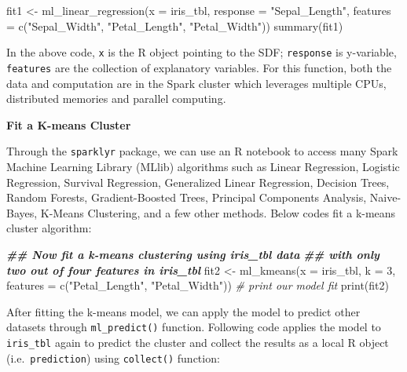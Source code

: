 \documentclass[
  12pt,
]{krantz}
\makeatletter
\newenvironment{Shaded}{\begin{snugshade}}{\end{snugshade}}
\newcommand{\AttributeTok}[1]{\textcolor[rgb]{0.61,0.61,0.61}{#1}}
\newcommand{\CommentTok}[1]{\textcolor[rgb]{0.37,0.37,0.37}{\textit{#1}}}
\newcommand{\DecValTok}[1]{\textcolor[rgb]{0.06,0.06,0.06}{#1}}
\newcommand{\DocumentationTok}[1]{\textcolor[rgb]{0.37,0.37,0.37}{\textbf{\textit{#1}}}}
\newcommand{\FunctionTok}[1]{\textcolor[rgb]{0,0,0}{#1}}
\newcommand{\NormalTok}[1]{#1}
\newcommand{\OtherTok}[1]{\textcolor[rgb]{0.37,0.37,0.37}{#1}}
\newcommand{\StringTok}[1]{\textcolor[rgb]{0.5,0.5,0.5}{#1}}
\newenvironment{kframe}{%
\medskip{}
\setlength{\fboxsep}{.8em}
 \def\at@end@of@kframe{}%
 \ifinner\ifhmode%
  \def\at@end@of@kframe{\end{minipage}}%
  \begin{minipage}{\columnwidth}%
 \fi\fi%
 \def\FrameCommand##1{\hskip\@totalleftmargin \hskip-\fboxsep
 \colorbox{shadecolor}{##1}\hskip-\fboxsep
     \hskip-\linewidth \hskip-\@totalleftmargin \hskip\columnwidth}%
 \MakeFramed {\advance\hsize-\width
   \@totalleftmargin\z@ \linewidth\hsize
   \@setminipage}}%
 {\par\unskip\endMakeFramed%
 \at@end@of@kframe}
\renewenvironment{Shaded}{\begin{kframe}}{\end{kframe}}
\makeatother
\begin{document}
\begin{Shaded}
\begin{Highlighting}[]
\NormalTok{fit1 }\OtherTok{\textless{}{-}} \FunctionTok{ml\_linear\_regression}\NormalTok{(}\AttributeTok{x =}\NormalTok{ iris\_tbl, }
                \AttributeTok{response =} \StringTok{"Sepal\_Length"}\NormalTok{,}
                \AttributeTok{features =} \FunctionTok{c}\NormalTok{(}\StringTok{"Sepal\_Width"}\NormalTok{, }\StringTok{"Petal\_Length"}\NormalTok{, }\StringTok{"Petal\_Width"}\NormalTok{))}
\FunctionTok{summary}\NormalTok{(fit1)}
\end{Highlighting}
\end{Shaded}

In the above code, \texttt{x} is the R object pointing to the SDF; \texttt{response} is y-variable, \texttt{features} are the collection of explanatory variables. For this function, both the data and computation are in the Spark cluster which leverages multiple CPUs, distributed memories and parallel computing.

\textbf{Fit a K-means Cluster}

Through the \texttt{sparklyr} package, we can use an R notebook to access many Spark Machine Learning Library (MLlib) algorithms such as Linear Regression, Logistic Regression, Survival Regression, Generalized Linear Regression, Decision Trees, Random Forests, Gradient-Boosted Trees, Principal Components Analysis, Naive-Bayes, K-Means Clustering, and a few other methods. Below codes fit a k-means cluster algorithm:

\begin{Shaded}
\begin{Highlighting}[]
\DocumentationTok{\#\# Now fit a k{-}means clustering using iris\_tbl data}
\DocumentationTok{\#\# with only two out of four features in iris\_tbl}
\NormalTok{fit2 }\OtherTok{\textless{}{-}} \FunctionTok{ml\_kmeans}\NormalTok{(}\AttributeTok{x =}\NormalTok{ iris\_tbl, }\AttributeTok{k =} \DecValTok{3}\NormalTok{,}
                    \AttributeTok{features =} \FunctionTok{c}\NormalTok{(}\StringTok{"Petal\_Length"}\NormalTok{, }\StringTok{"Petal\_Width"}\NormalTok{))}
\CommentTok{\# print our model fit}
\FunctionTok{print}\NormalTok{(fit2)}
\end{Highlighting}
\end{Shaded}

After fitting the k-means model, we can apply the model to predict other datasets through \texttt{ml\_predict()} function. Following code applies the model to \texttt{iris\_tbl} again to predict the cluster and collect the results as a local R object (i.e.~\texttt{prediction}) using \texttt{collect()} function:
\end{document}
